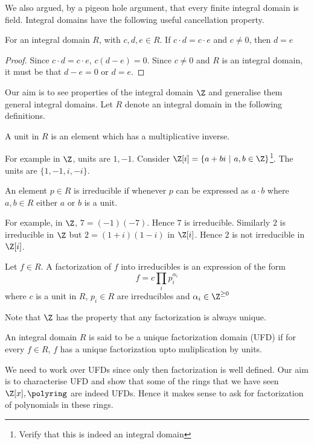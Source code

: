 We also argued, by a pigeon hole argument, that every finite integral domain is
field. Integral domains have the following useful cancellation property.
\begin{lemma} \label{lem:id-cancel}
	For an integral domain $R$, with $c,d,e \in R$. If 
	$c\cdot d = c\cdot e$ and $c \ne 0$, then $d=e$
\end{lemma}
\begin{proof}
	Since $c\cdot d = c \cdot e$, $c(d-e) = 0$. Since $c \ne 0$ and $R$ is
	an integral domain, it must be that $d-e = 0$ or $d=e$.
\end{proof}

Our aim is to see properties of the integral domain $\Z$ and generalise them
general integral domains. Let $R$ denote an integral domain in the following
definitions.
\begin{definition}[Unit]
	A unit in $R$ is an element which has a multiplicative inverse.
\end{definition}
For example in $\Z$, units are $1,-1$. Consider $\Z[i] = \{a + bi ~|~ a,b \in
\Z \}$\footnote{Verify that this is indeed an integral domain}.  The units are
$\{1,-1,i,-i\}$. 
\begin{definition}[Irreducible]
	An element $p \in R$ is irreducible if whenever $p$ can be expressed
	as $a \cdot b$ where $a,b \in R$ either $a$ or $b$ is a unit.
\end{definition}
For example, in $\Z$, $7 = (-1)(-7)$. Hence $7$ is irreducible. Similarly $2$
is irreducible in $\Z$ but $2 = (1+i)(1-i)$ in $\Z[i]$. Hence $2$ is not
irreducible in $\Z[i]$.

\begin{definition}[Factorization]
	Let $f \in R$. A factorization of $f$ into irreducibles is an
	expression of the form \[ f = c\prod_i p_i^{\alpha_i}\] where $c$ is a
	unit in $R$, $p_i \in R$ are irreducibles and $\alpha_i \in \Z^{\ge
	0}$
\end{definition}

Note that $\Z$ has the property that any factorization is always unique.
\begin{definition}
	An integral domain $R$ is said to be a unique factorization domain
	(UFD) if for every $f \in R$, $f$ has a unique factorization upto
	muliplication by units.
\end{definition}
We need to work over UFDs since only then factorization is well defined. 
Our aim is to characterise UFD and show that some of the rings that we have
seen $\Z[x], \polyring$ are indeed UFDs. Hence it makes sense to ask for
factorization of polynomials in these rings.

